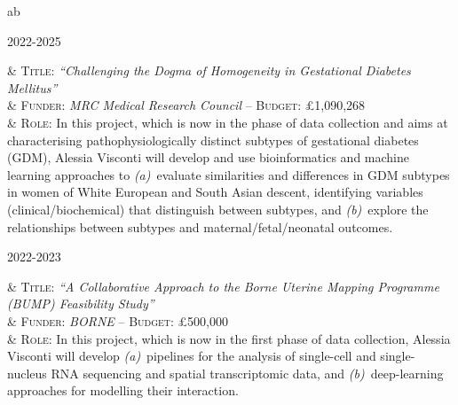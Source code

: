 \documentclass[a4paper,10pt]{article}
\newenvironment{singletablelist}
{	\vspace{-0.2cm}
	\begin{longtable}[!h]{ab}}{\end{longtable}
}
\newcommand{\stlist}[2]{
	\hspace{-3cm}
	\noindent
	\begin{minipage}{0.24\textwidth}
	\begin{flushright}
	\textsc{#1}
	\end{flushright}
	\end{minipage}
	& #2\\[0.2cm]
}
\begin{document}
\begin{singletablelist}
	
    \stlist{2022-2025}{ 
		  \textsc{Title:} \emph{``Challenging the Dogma of Homogeneity in Gestational Diabetes Mellitus''}\\
		& \textsc{Funder:} \emph{MRC Medical Research Council} -- \textsc{Budget:} £1,090,268  \\
		& \textsc{Role:} In this project, which is now in the phase of data collection and aims at characterising pathophysiologically distinct subtypes of gestational diabetes (GDM), Alessia Visconti will develop and use bioinformatics and machine learning approaches to \emph{(a)}~evaluate similarities and differences in GDM subtypes in women of White European and South Asian descent, identifying variables (clinical/biochemical) that distinguish between subtypes, and \emph{(b)}~explore the relationships between subtypes and maternal/fetal/neonatal outcomes.
		}
	 
	\stlist{2022-2023}{
		  \textsc{Title:} \emph{``A Collaborative Approach to the Borne Uterine Mapping Programme (BUMP) Feasibility Study''}\\
		& \textsc{Funder:} \emph{BORNE} -- \textsc{Budget:} £500,000 \\
		& \textsc{Role:} In this project, which is now in the first phase of data collection, Alessia Visconti will develop \emph{(a)}~pipelines for the analysis of single-cell and single-nucleus RNA sequencing and spatial transcriptomic data, and \emph{(b)}~deep-learning approaches for modelling their interaction.
	} 
		
\end{singletablelist}

\newpage
\end{document}
